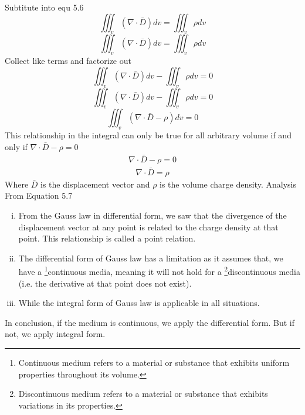 Subtitute into equ 5.6
\begin{equation*}
\iiint_v(\nabla\cdot \bar{D})dv = \iiint_v\rho dv
\end{equation*}
\begin{equation*}
\iiint_v(\nabla\cdot \bar{D})dv = \iiint_v\rho dv
\end{equation*}
Collect like terms and factorize out
\begin{equation*}
\iiint_v(\nabla\cdot \bar{D})dv - \iiint_v\rho dv = 0
\end{equation*}
\begin{equation*}
\iiint_v(\nabla\cdot \bar{D})dv - \iiint_v\rho dv = 0
\end{equation*}
\begin{equation*}
\iiint_v(\nabla\cdot \bar{D} - \rho)dv = 0
\end{equation*}
This relationship in the integral can only be
true for all arbitrary volume if and only if $\nabla\cdot\bar{D} - \rho = 0$
\begin{align*}
\nabla \cdot \bar{D} - \rho = 0
\end{align*}
\begin{align}
\boxed{\nabla \cdot \bar{D} = \rho}
\end{align}
Where $\bar{D}$ is the displacement vector and $\rho$ is the volume charge density.
Analysis From Equation 5.7
\begin{enumerate}[(i)]
\item From the Gauss law in differential form, we saw that the divergence of the displacement vector at any point is related to the charge density at that point. This relationship is called a point relation.
\item The differential form of Gauss law has a limitation as it assumes that, we have a \footnote[7]{ Continuous medium refers to a material or substance that exhibits uniform properties throughout its volume.}continuous media, meaning it will not hold for a \footnote[8]{Discontinuous medium refers to a material or substance that exhibits variations in its properties.}discontinuous media (i.e. the derivative at that point does not exist).
\item While the integral form of Gauss law is applicable in all situations.
\end{enumerate}
In conclusion, if the medium is continuous, we apply the differential form. But if not, we apply integral form.

